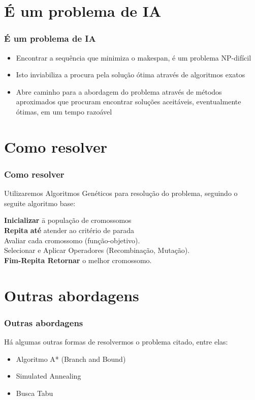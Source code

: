 \documentclass[12pt]{beamer}
\begin{document}
\section{É um problema de IA}
\begin{frame}
        \frametitle{É um problema de IA}
        \begin{block}{}
                \begin{itemize}
                        \item Encontrar a sequência que minimiza o makespan, é um problema NP-difícil   \pause
                        \item Isto inviabiliza a procura pela solução ótima através de algoritmos exatos   \pause
                        \item Abre caminho para a abordagem do problema através de métodos aproximados que procuram encontrar soluções aceitáveis, eventualmente ótimas, em um tempo razoável  \pause
                \end{itemize}
        \end{block}
\end{frame}

\section{Como resolver} 
\begin{frame} 
        \frametitle{Como resolver}
        \begin{block}{Utilizaremos Algoritmos Genéticos para resolução do problema, seguindo o seguite algoritmo base:}
	\begin{tabbing}
	{\bf Inicializar} \= a população de cromossomos \\
	{\bf Repita} \= {\bf até} atender ao critério de parada \\
	\> Avaliar cada cromossomo (função-objetivo). \\
	\> Selecionar e Aplicar Operadores (Recombinação, Mutação).\\
	{\bf Fim-Repita Retornar} o melhor cromossomo.
	\end{tabbing}
	\end{block}
\end{frame}

\section{Outras abordagens} 
\begin{frame} 
        \frametitle{Outras abordagens}
        \begin{block}{Há algumas outras formas de resolvermos o problema citado, entre elas:}
                \begin{itemize}
                        \item Algoritmo A* (Branch and Bound)    \pause
                        \item Simulated Annealing   \pause
                        \item Busca Tabu  \pause
                \end{itemize}
        \end{block}
\end{frame}
              
\end{document}
